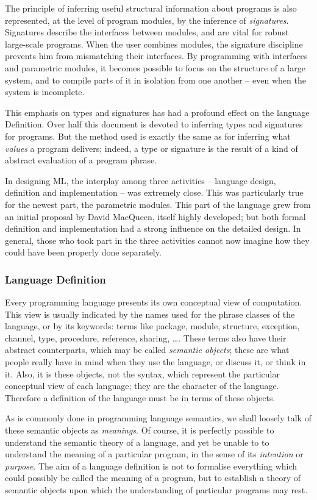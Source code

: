 The principle of inferring useful structural information about programs
is also represented, at the level of program modules, by the inference of 
{\sl signatures}.
Signatures describe the interfaces between modules, and are vital for robust
large-scale programs.  When the user combines modules, the signature
discipline prevents him from mismatching their interfaces.  By programming
with interfaces and parametric modules, it becomes possible to focus on the
structure of a large system, and to compile parts of it in isolation from
one another -- even when the system is incomplete.

This emphasis on types and signatures has had a profound effect on the 
language Definition. Over half this document is devoted to inferring types 
and signatures for programs.  But the method used is exactly the same as for 
inferring what {\sl values} a program delivers; indeed, a type or signature is 
the result of a kind of abstract evaluation of a program phrase. 

In designing ML, 
the interplay among three activities -- language design, definition and 
implementation -- was extremely close. This was particularly true for the
newest part, the parametric modules. This part of the language grew from an 
initial proposal by David MacQueen, itself highly developed; but both 
formal definition and implementation had a strong influence on the detailed
design.  In general, those who took part in the three activities cannot now 
imagine how they could have been properly done separately.  

\subsubsection*{Language Definition}
Every programming language presents  its own conceptual view of 
computation.  This view is usually indicated by the names used for the phrase 
classes of the language, or by its keywords: terms like package, module, 
structure, exception, channel, type, procedure, reference, sharing, \ldots. 
These terms also have their abstract counterparts,  which may be called
{\sl semantic objects}; these are what people really have in mind when they use
the language, or discuss it, or think in it.  Also, it is these objects,
not the syntax, which represent the particular conceptual view of each
language; they are the character of the language.  Therefore a definition
of the language must be in terms of these objects.  

As is commonly done in programming language semantics, we shall loosely
talk of these semantic objects as {\sl meanings}. Of course, it is 
perfectly possible to understand the semantic theory of a language, and
yet be unable to to understand the meaning of a particular program, in the
sense of its {\sl intention} or {\sl purpose}.  The aim of a language
definition is not to formalise everything which could possibly be called the
meaning of a program, but to establish a theory of semantic objects  
upon which the understanding of particular programs may rest.

